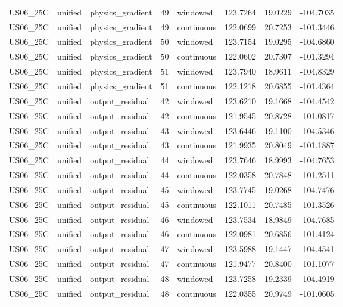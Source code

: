 \begin{tabular}{llllllll}
US06\_25C & unified & physics\_gradient & 49 & windowed & 123.7264 & 19.0229 & -104.7035 \\
US06\_25C & unified & physics\_gradient & 49 & continuous & 122.0699 & 20.7253 & -101.3446 \\
US06\_25C & unified & physics\_gradient & 50 & windowed & 123.7154 & 19.0295 & -104.6860 \\
US06\_25C & unified & physics\_gradient & 50 & continuous & 122.0602 & 20.7307 & -101.3294 \\
US06\_25C & unified & physics\_gradient & 51 & windowed & 123.7940 & 18.9611 & -104.8329 \\
US06\_25C & unified & physics\_gradient & 51 & continuous & 122.1218 & 20.6855 & -101.4364 \\
US06\_25C & unified & output\_residual & 42 & windowed & 123.6210 & 19.1668 & -104.4542 \\
US06\_25C & unified & output\_residual & 42 & continuous & 121.9545 & 20.8728 & -101.0817 \\
US06\_25C & unified & output\_residual & 43 & windowed & 123.6446 & 19.1100 & -104.5346 \\
US06\_25C & unified & output\_residual & 43 & continuous & 121.9935 & 20.8049 & -101.1887 \\
US06\_25C & unified & output\_residual & 44 & windowed & 123.7646 & 18.9993 & -104.7653 \\
US06\_25C & unified & output\_residual & 44 & continuous & 122.0358 & 20.7848 & -101.2511 \\
US06\_25C & unified & output\_residual & 45 & windowed & 123.7745 & 19.0268 & -104.7476 \\
US06\_25C & unified & output\_residual & 45 & continuous & 122.1011 & 20.7485 & -101.3526 \\
US06\_25C & unified & output\_residual & 46 & windowed & 123.7534 & 18.9849 & -104.7685 \\
US06\_25C & unified & output\_residual & 46 & continuous & 122.0981 & 20.6856 & -101.4124 \\
US06\_25C & unified & output\_residual & 47 & windowed & 123.5988 & 19.1447 & -104.4541 \\
US06\_25C & unified & output\_residual & 47 & continuous & 121.9477 & 20.8400 & -101.1077 \\
US06\_25C & unified & output\_residual & 48 & windowed & 123.7258 & 19.2339 & -104.4919 \\
US06\_25C & unified & output\_residual & 48 & continuous & 122.0355 & 20.9749 & -101.0605 \\

\end{tabular}
